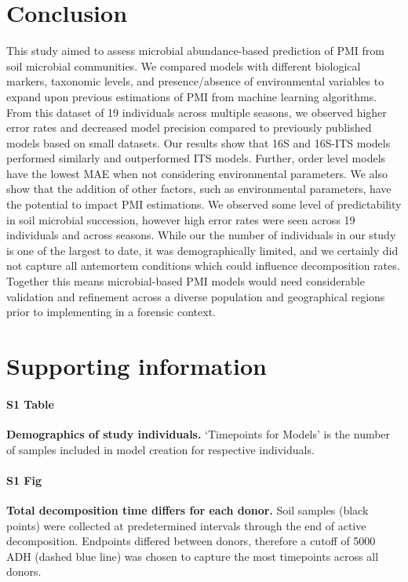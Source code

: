 \documentclass[
  10pt,
  letterpaper,
]{article}
\begin{document}
\section{Conclusion}\label{conclusion}

This study aimed to assess microbial abundance-based prediction of PMI
from soil microbial communities. We compared models with different
biological markers, taxonomic levels, and presence/absence of
environmental variables to expand upon previous estimations of PMI from
machine learning algorithms. From this dataset of 19 individuals across
multiple seasons, we observed higher error rates and decreased model
precision compared to previously published models based on small
datasets. Our results show that 16S and 16S-ITS models performed
similarly and outperformed ITS models. Further, order level models have
the lowest MAE when not considering environmental parameters. We also
show that the addition of other factors, such as environmental
parameters, have the potential to impact PMI estimations. We observed
some level of predictability in soil microbial succession, however high
error rates were seen across 19 individuals and across seasons. While
our the number of individuals in our study is one of the largest to
date, it was demographically limited, and we certainly did not capture
all antemortem conditions which could influence decomposition rates.
Together this means microbial-based PMI models would need considerable
validation and refinement across a diverse population and geographical
regions prior to implementing in a forensic context.

\section{Supporting information}\label{supporting-information}

\paragraph*{S1 Table}
\label{s1-table}
{\textbf{Demographics of study individuals.}} `Timepoints for Models' is
the number of samples included in model creation for respective
individuals.

\paragraph*{S1 Fig}
\label{s1-fig}
{\textbf{Total decomposition time differs for each donor.}} Soil samples
(black points) were collected at predetermined intervals through the end
of active decomposition. Endpoints differed between donors, therefore a
cutoff of 5000 ADH (dashed blue line) was chosen to capture the most
timepoints across all donors.
\end{document}
